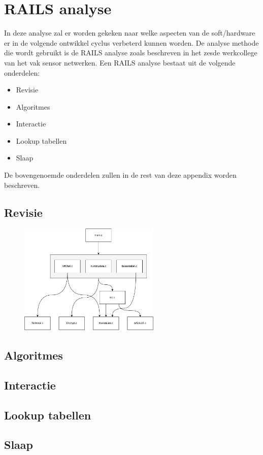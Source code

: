 \section{RAILS analyse} \label{app:railsAnalysis}

In deze analyse zal er worden gekeken naar welke aspecten van de soft/hardware er in de volgende ontwikkel cyclus verbeterd kunnen worden. De analyse methode die wordt gebruikt is de RAILS analyse zoals beschreven in het zesde werkcollege van het vak sensor netwerken. Een RAILS analyse bestaat uit de volgende onderdelen:
\begin{itemize}
    \item Revisie
    \item Algoritmes
    \item Interactie
    \item Lookup tabellen
    \item Slaap
\end{itemize}
De bovengenoemde onderdelen zullen in de rest van deze appendix worden beschreven.

\subsection{Revisie}

\begin{figure}[h]
    \centering
    \includegraphics[width=0.6\textwidth]{img/abstractions}
\end{figure}

\subsection{Algoritmes}


\subsection{Interactie}

\subsection{Lookup tabellen}

\subsection{Slaap}

